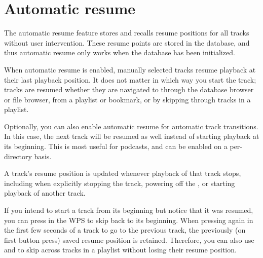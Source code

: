 \section{\label{ref:Autoresumeconfigactual}Automatic resume}

The automatic resume feature stores and recalls resume positions for
all tracks without user intervention.  These resume points are stored
in the database, and thus automatic resume only works when the
database has been initialized.

When automatic resume is enabled, manually selected tracks resume
playback at their last playback position.  It does not matter in which
way you start the track; tracks are resumed whether they are navigated
to through the database browser or file browser, from a playlist or
bookmark, or by skipping through tracks in a playlist.

Optionally, you can also enable automatic resume for automatic track
transitions.  In this case, the next track will be resumed as well
instead of starting playback at its beginning.  This is most useful
for podcasts, and can be enabled on a per-directory basis.

A track's resume position is updated whenever playback of that track
stops, including when explicitly stopping the track, powering off the
\dap{}, or starting playback of another track.

If you intend to start a track from its beginning but notice that it
was resumed, you can press \ActionWpsSkipPrev{} in the WPS to skip back to
its beginning.  When pressing \ActionWpsSkipPrev{} again in the first few
seconds of a track to go to the previous track, the previously (on
first button press) saved resume position is retained.  Therefore, you
can also use \ActionWpsSkipPrev{} and \ActionWpsSkipNext{} to skip
across tracks in a playlist without losing their resume position.

